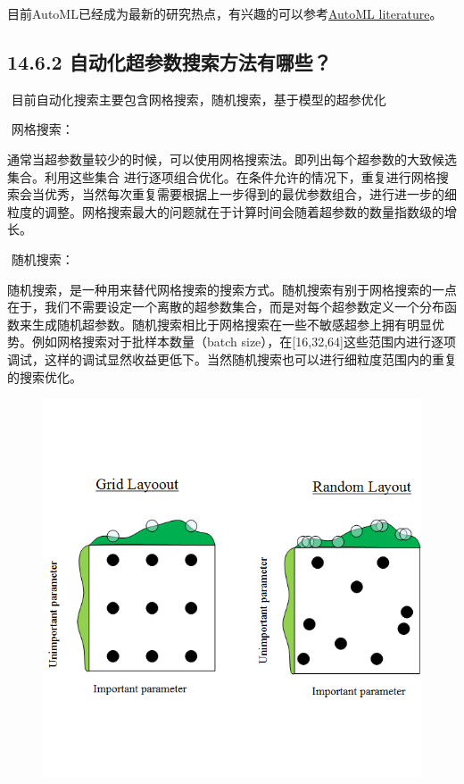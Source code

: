 目前AutoML已经成为最新的研究热点，有兴趣的可以参考\href{https://www.automl.org/automl/literature-on-neural-architecture-search/}{AutoML
literature}。

\subsection{14.6.2
自动化超参数搜索方法有哪些？}\label{ux81eaux52a8ux5316ux8d85ux53c2ux6570ux641cux7d22ux65b9ux6cd5ux6709ux54eaux4e9b}

​ 目前自动化搜索主要包含网格搜索，随机搜索，基于模型的超参优化

​ 网格搜索：

​
通常当超参数量较少的时候，可以使用网格搜索法。即列出每个超参数的大致候选集合。利用这些集合
进行逐项组合优化。在条件允许的情况下，重复进行网格搜索会当优秀，当然每次重复需要根据上一步得到的最优参数组合，进行进一步的细粒度的调整。网格搜索最大的问题就在于计算时间会随着超参数的数量指数级的增长。

​ 随机搜索：

​
随机搜索，是一种用来替代网格搜索的搜索方式。随机搜索有别于网格搜索的一点在于，我们不需要设定一个离散的超参数集合，而是对每个超参数定义一个分布函数来生成随机超参数。随机搜索相比于网格搜索在一些不敏感超参上拥有明显优势。例如网格搜索对于批样本数量（batch
size），在{[}16,32,64{]}这些范围内进行逐项调试，这样的调试显然收益更低下。当然随机搜索也可以进行细粒度范围内的重复的搜索优化。

\begin{figure}
\centering
\includegraphics{./img/ch14/14.14.png}
\caption{}
\end{figure}

